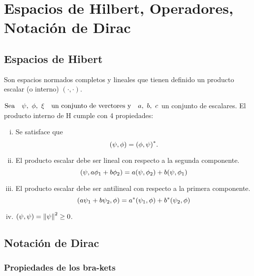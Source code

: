 
\section{Espacios de Hilbert, Operadores, Notación de Dirac}

 \subsection{Espacios de Hibert}

     \begin{definition}
         Son espacios normados completos y lineales que tienen definido un producto escalar (o interno) $(\cdot,\cdot)$.
     \end{definition}

     $\qq*{Sea}\psi,~\phi,~\xi\qq{un conjunto de verctores y}a,~b,~c$ un conjunto de escalares. El producto interno de H cumple con 4 propiedades:

     \begin{enumerate}[i.]
         \item Se satisface que
               \[
                   \qty(\psi,\phi)=\qty(\phi,\psi)^*.
               \]
         \item El producto escalar debe ser lineal con respecto a la segunda componente.
               \[
                   \qty(\psi,a\phi_1+b\phi_2)=a\qty(\psi,\phi_2)+b\qty(\psi,\phi_1)
               \]
         \item El producto escalar debe ser antilineal con respecto a la primera componente.
               \[
                   \qty(a\psi_1+b\psi_2,\phi)=a^*\qty(\psi_1,\phi)+b^*\qty(\psi_2,\phi)
               \]
         \item $\qty(\psi,\psi)=\norm{\psi}^2\geq 0$.
     \end{enumerate}

     \begin{recordar}

     \end{recordar}

     \begin{example}
     \end{example}

 \subsection{Notación de Dirac}
     \subsubsection{Propiedades de los bra-kets}

